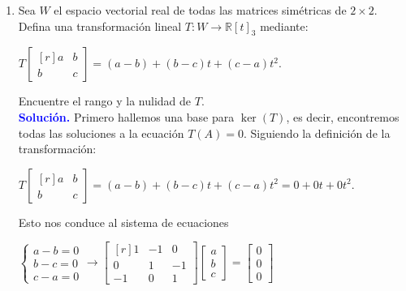 \documentclass[11pt]{article}
\newcommand{\solution}{\textcolor{blue}{\textbf{Solución. }}}
\begin{document}
\begin{enumerate}
	\item Sea $W$ el espacio vectorial real de todas las matrices simétricas de $2\times 2$. Defina una transformación lineal $T:W\rightarrow \mathbb{R}[t]_3$ mediante:
	\begin{center}
		$T\begin{bmatrix*}[r]a & b\\ b & c\end{bmatrix*} = (a-b) + (b-c)t + (c-a)t^2$.
	\end{center}
	Encuentre el rango y la nulidad de $T$. \\
	\solution Primero hallemos una base para $\ker (T)$, es decir, encontremos todas las soluciones a la ecuación $T(A) = 0$. Siguiendo la definición de la transformación:
	\begin{center}
		$T\begin{bmatrix*}[r]a & b\\ b & c\end{bmatrix*} = (a-b) + (b-c)t + (c-a)t^2 = 0+0t+0t^2$.
	\end{center}
	Esto nos conduce al sistema de ecuaciones
	\begin{center}
	    $\begin{cases}
		    a - b = 0 \\
	    	b - c = 0 \\
	    	c - a = 0
	    \end{cases} \rightarrow 
	    \begin{bmatrix*}[r]
	         1 & -1 & 0 \\ 
	         0 & 1 & -1 \\
	        -1 & 0 & 1
	    \end{bmatrix*} \begin{bmatrix*} a \\ b \\ c\end{bmatrix*} = \begin{bmatrix*}0 \\ 0 \\ 0\end{bmatrix*}$
	\end{center}
	

\end{enumerate}
\end{document}
